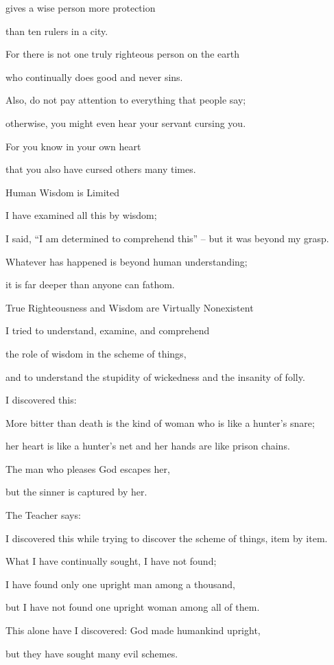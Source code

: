 {gives
a wise
person more protection
\par }{\Q than ten
rulers
in a city.
\par }{\Q {}For
there is not
one truly righteous
person
on the earth
\par }{\Q who
continually does
good
and never
sins.
\par }{\Q {}Also,
do not
pay
attention
to everything
that
people say;
\par }{\Q otherwise, you might even hear
your servant
cursing you.
\par }{\Q {}For
you know
in your own heart
\par }{\Q that
you also
have
cursed
others
many
times.
\par }{\SH Human Wisdom is Limited
\par }{\Q {}I have examined
all
this by
wisdom;
\par }{\Q I said,
“I am determined to comprehend this” – but it was beyond my grasp.
\par }{\Q {}Whatever
has happened
is beyond human understanding;

\par }{\Q it is far
deeper
than anyone
can fathom.
\par }{\SH True Righteousness and Wisdom are Virtually Nonexistent
\par }{\Q {}I
tried
to understand,
examine,
and comprehend
\par }{\Q the role of wisdom
in the scheme of things,
\par }{\Q and to understand
the stupidity
of wickedness
and the insanity
of folly.
\par }{\Q {}I
discovered
this:

\par }{\Q More bitter
than death
is the kind of woman
who
is like a hunter’s snare;
\par }{\Q her heart
is like a hunter’s net
and her hands
are like prison chains.
\par }{\Q The man who pleases
God
escapes
her,
\par }{\Q but the sinner
is captured by her.
\par }{\Q {}The Teacher
says:
\par }{\Q I discovered
this
while trying to discover
the scheme
of things, item by item.
\par }{\Q {}What
I have continually
sought,
I
have not
found;
\par }{\Q I have found only one upright
man
among a thousand,
\par }{\Q but I have
not
found
one upright
woman
among
all of them.
\par }{\Q {}This
alone
have
I discovered: God
made
humankind
upright,
\par }{\Q but they
have sought
many
evil schemes.

}
